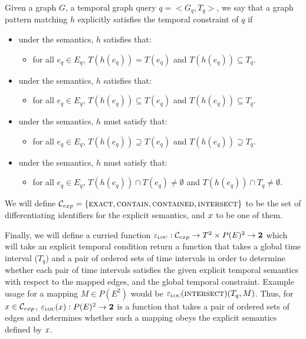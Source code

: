 \begin{defn}
\label{explicit-temp-semantics}
Given a graph $G$, a temporal graph query $q= <G_q, T_q>$, we say that a graph
pattern matching $h$ explicitly satisfies the temporal constraint of $q$ if
\begin{itemize}
	\item under the \exact{} semantics, $h$ satisfies that:
	\begin{itemize}
		\item for all $e_q \in E_q$, $T(h(e_q)) = T(e_q)$ and $T(h(e_q))
                  \subseteq T_q$.
	\end{itemize}

	\item under the \contain{} semantics, $h$ satisfies that:
	\begin{itemize}
		\item for all $e_q \in E_q$, $T(h(e_q)) \subseteq T(e_q)$ and
                  $T(h(e_q)) \subseteq T_q$.
	\end{itemize}

	\item under the \contained{} semantics, $h$ must satisfy that:
	\begin{itemize}
		\item for all $e_q \in E_q$, $T(h(e_q)) \supseteq T(e_q)$ and
                  $T(h(e_q)) \supseteq T_q$.
	\end{itemize}

	\item under the \intersection{} semantics, $h$ must satisfy that:
	\begin{itemize}
		\item for all $e_q \in E_q$, $T(h(e_q)) \cap T(e_q) \not=
                  \emptyset $ and $T(h(e_q)) \cap T_q \not= \emptyset$.
	\end{itemize}
\end{itemize}



  We will define $\mathcal{C}_{exp} = \{\textsc{exact}, \textsc{contain}, \textsc{contained}, \textsc{intersect}\}$ to
  be the set of differentiating identifiers for the explicit semantics, and
  $x$ to be one of them.

  Finally, we will define a curried function $\varepsilon_{\textsc{loc}} : \mathcal{C}_{exp} \to T^2 \times
  P(E)^2 \to \textbf{2}$ which will take an explicit temporal condition return a
  function that takes a global time interval ($T_q$) and a pair of ordered sets
  of time intervals in order to determine whether each pair of time intervals
  satisfies the given explicit temporal semantics with respect to the mapped
  edges, and the global temporal constraint. Example usage for a mapping $M \in
  P(E^2)$ would be $\varepsilon_{\textsc{loc}}(\textsc{intersect})(T_q,M)$. Thus, for $x \in
  \mathcal{C}_{exp}$, $\varepsilon_{\textsc{loc}}(x) : P(E)^2 \to \textbf{2}$ is a function that takes
  a pair of ordered sets of edges and determines whether such a mapping obeys
  the explicit semantics defined by $x$.

\end{defn}

